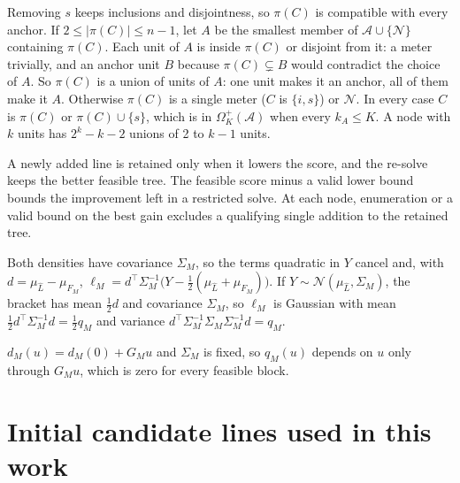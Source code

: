 \documentclass[journal,onecolumn,11pt]{IEEEtran}
\newcommand{\tp}{^{\top}}
\newcommand{\Nset}{\mathcal{N}}
\newcommand{\Aset}{\mathcal{A}}
\begin{document}
\begin{IEEEproof}
Removing $s$ keeps inclusions and disjointness, so $\pi(C)$ is compatible with every anchor. If $2\le|\pi(C)|\le n-1$, let
$A$ be the smallest member of $\Aset\cup\{\Nset\}$ containing $\pi(C)$. Each unit of $A$ is inside $\pi(C)$ or disjoint from
it: a meter trivially, and an anchor unit $B$ because $\pi(C)\subsetneq B$ would contradict the choice of $A$. So $\pi(C)$ is
a union of units of $A$: one unit makes it an anchor, all of them make it $A$. Otherwise $\pi(C)$ is a single meter ($C$ is
$\{i,s\}$) or $\Nset$. In every case $C$ is $\pi(C)$ or $\pi(C)\cup\{s\}$, which is in $\Omega^+_K(\Aset)$ when every
$k_A\le K$. A node with $k$ units has $2^k-k-2$ unions of 2 to $k-1$ units.
\end{IEEEproof}

\begin{IEEEproof}
A newly added line is retained only when it lowers the score, and the re-solve keeps the better feasible tree.
The feasible score minus a valid lower bound bounds the improvement left in a restricted solve. At each node,
enumeration or a valid bound on the best gain excludes a qualifying single addition to the retained tree.
\end{IEEEproof}

\begin{IEEEproof}
Both densities have covariance $\Sigma_M$, so the terms quadratic in $Y$ cancel and, with $d=\mu_{\hat L}-\mu_{F_M}$,
$\ell_M=d\tp\Sigma_M^{-1}\big(Y-\tfrac12(\mu_{\hat L}+\mu_{F_M})\big)$. If $Y\sim\mathcal N(\mu_{\hat L},\Sigma_M)$, the
bracket has mean $\tfrac12d$ and covariance $\Sigma_M$, so $\ell_M$ is Gaussian with mean $\tfrac12d\tp\Sigma_M^{-1}d=
\tfrac12q_M$ and variance $d\tp\Sigma_M^{-1}\Sigma_M\Sigma_M^{-1}d=q_M$.
\end{IEEEproof}

\begin{IEEEproof}
$d_M(u)=d_M(0)+G_Mu$ and $\Sigma_M$ is fixed, so $q_M(u)$ depends on $u$ only through $G_Mu$, which is zero for every
feasible block.
\end{IEEEproof}

\section{Initial candidate lines used in this work}\label{app:pool}
\end{document}
